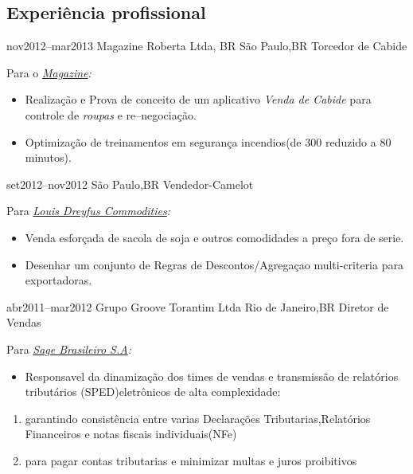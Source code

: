 \documentclass[a4paper]{myfriggeri-cv}
\begin{document}
\subsection{Experiência profissional}
\begin{entrylist}

\entry
{nov2012--mar2013}
{Magazine Roberta Ltda, BR}
{São Paulo,BR}%
{Torcedor de Cabide}
{Para o \emph{\href{http://www.magazineluiza.com.br/}{Magazine}:}
\begin{itemize}
\item{}Realização e Prova de conceito de um aplicativo \textit{Venda de Cabide} para controle de \textit{roupas} e re–negociação.\\
\item{}Optimização de treinamentos em segurança incendios(de 300 reduzido a 80 minutos).
\end{itemize}
}

\entry
{set2012--nov2012}
{}
{São Paulo,BR}
{Vendedor-Camelot}
{Para \emph{\href{http://www.ldcom.com/br/pr/}{Louis Dreyfus Commodities}:}
\begin{itemize}
\item{}Venda esforçada de sacola de soja e outros comodidades a preço fora de serie.\\
\item{}Desenhar um conjunto de Regras de Descontos\slash Agregaçao multi-criteria para exportadoras.
\end{itemize}
}
\entry
{abr2011--mar2012}
{Grupo Groove Torantim Ltda}
{Rio de Janeiro,BR}%
{Diretor de Vendas}
{Para \emph{\href{http://https://www.sagestart.com.br/}{Sage Brasileiro S.A}:}
\begin{itemize}
\item{} Responsavel da dinamização dos times de vendas e transmissão de relatórios tributários (SPED)eletrônicos de alta complexidade:
\end{itemize}
\begin{enumerate}
\item{} garantindo consistência entre varias Declarações Tributarias,Relatórios Financeiros e notas fiscais individuais(NFe)
\item{} para pagar contas tributarias e minimizar multas e juros proibitivos
\end{enumerate}
}
\end{entrylist}
\end{document}
